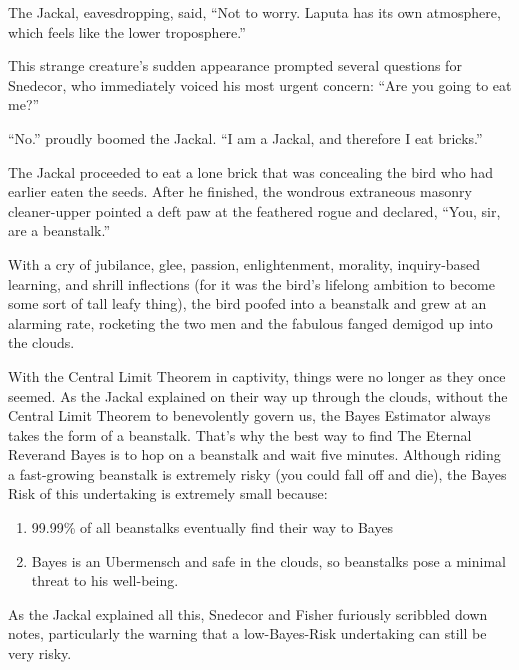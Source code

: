 \documentclass{article}
\begin{document}
The Jackal, eavesdropping, said, ``Not to worry. Laputa has its own atmosphere, which feels like the lower troposphere.'' \newline

This strange creature's sudden appearance prompted several questions for Snedecor, who immediately voiced his most urgent concern: ``Are you going to eat me?'' \newline

``No.'' proudly boomed the Jackal. ``I am a Jackal, and therefore I eat bricks.'' \newline

The Jackal proceeded to eat a lone brick that was concealing the bird who had earlier eaten the seeds. After he finished, the wondrous extraneous masonry cleaner-upper pointed a deft paw at the feathered rogue and declared, ``You, sir, are a beanstalk.'' \newline

With a cry of jubilance, glee, passion, enlightenment, morality, inquiry-based learning, and shrill inflections (for it was the bird's lifelong ambition to become some sort of tall leafy thing), the bird poofed into a beanstalk and grew at an alarming rate, rocketing the two men and the fabulous fanged demigod up into the clouds. \newline

With the Central Limit Theorem in captivity, things were no longer as they once seemed. As the Jackal explained on their way up through the clouds, without the Central Limit Theorem to benevolently govern us, the Bayes Estimator always takes the form of a beanstalk. That's why the best way to find The Eternal Reverand Bayes is to hop on a beanstalk and wait five minutes. Although riding a fast-growing beanstalk is extremely risky (you could fall off and die), the Bayes Risk of this undertaking is extremely small because:

\begin{enumerate}
\item 99.99\% of all beanstalks eventually find their way to Bayes
\item Bayes is an Ubermensch and safe in the clouds, so beanstalks pose a minimal threat to his well-being.
\end{enumerate}
As the Jackal explained all this, Snedecor and Fisher furiously scribbled down notes, particularly the warning that a low-Bayes-Risk undertaking can still be very risky.

\end{document}
